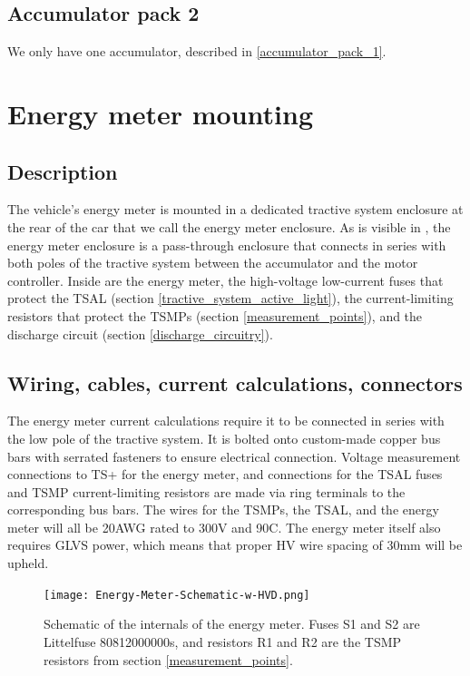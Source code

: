 \documentclass{article}
\begin{document}
\subsection{Accumulator pack 2}\label{accumulator_pack_2}
We only have one accumulator, described in \ref{accumulator_pack_1}.

\section{Energy meter mounting} \label{sec:energy_meter_mounting}
\subsection{Description}
The vehicle's energy meter is mounted in a dedicated tractive system enclosure at the rear of the car that we call the energy meter enclosure. As is visible in , the energy meter enclosure is a pass-through enclosure that connects in series with both poles of the tractive system between the accumulator and the motor controller. Inside are the energy meter, the high-voltage low-current fuses that protect the TSAL (section \ref{tractive_system_active_light}), the current-limiting resistors that protect the TSMPs (section \ref{measurement_points}), and the discharge circuit (section \ref{discharge_circuitry}). 

\subsection{Wiring, cables, current calculations, connectors}

The energy meter current calculations require it to be connected in series with the low pole of the tractive system. It is bolted onto custom-made copper bus bars with serrated fasteners to ensure electrical connection. Voltage measurement connections to TS+ for the energy meter, and connections for the TSAL fuses and TSMP current-limiting resistors are made via ring terminals to the corresponding bus bars. The wires for the TSMPs, the TSAL, and the energy meter will all be 20AWG rated to 300V and 90\textdegree C. The energy meter itself also requires GLVS power, which means that proper HV wire spacing of 30mm will be upheld. 

\begin{figure}[H]
\centering
\texttt{[image: Energy-Meter-Schematic-w-HVD.png]}
\caption{Schematic of the internals of the energy meter. Fuses S1 and S2 are Littelfuse 80812000000s, and resistors R1 and R2 are the TSMP resistors from section \ref{measurement_points}.}
\label{fig:energy_meter_schematic}
\end{figure}
\end{document}
